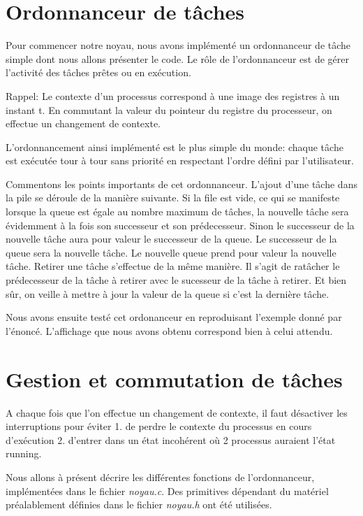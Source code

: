 \section{Ordonnanceur de tâches}
Pour commencer notre noyau, nous avons implémenté un ordonnanceur de tâche simple dont nous allons présenter le code. Le rôle de l'ordonnanceur est de gérer l'activité des tâches prêtes ou en exécution.

Rappel: Le contexte d'un processus correspond à une image des registres à un instant t. En commutant la valeur du pointeur du registre du processeur, on effectue un changement de contexte.


L'ordonnancement ainsi implémenté est le plus simple du monde: chaque tâche est exécutée tour à tour sans priorité en respectant l'ordre défini par l'utilisateur.

Commentons les points importants de cet ordonnanceur. L'ajout d'une tâche dans la pile se déroule de la manière suivante. Si la file est vide, ce qui se manifeste lorsque la queue est égale au nombre maximum de tâches, la nouvelle tâche sera évidemment à la fois son successeur et son prédecesseur. Sinon le successeur de la nouvelle tâche aura pour valeur le successeur de la queue. Le successeur de la queue sera la nouvelle tâche. Le nouvelle queue prend pour valeur la nouvelle tâche. Retirer une tâche s'effectue de la même manière. Il s'agit de ratâcher le prédecesseur de la tâche à retirer avec le sucesseur de la tâche à retirer. Et bien sûr, on veille à mettre à jour la valeur de la queue si c'est la dernière tâche.

Nous avons ensuite testé cet ordonanceur en reproduisant l'exemple donné par l'énoncé. L'affichage que nous avons obtenu correspond bien à celui attendu.


\section{Gestion et commutation de tâches}
A chaque fois que l'on effectue un changement de contexte, il faut désactiver les interruptions pour éviter 1. de perdre le contexte du processus en cours d'exécution 2. d'entrer dans un état incohérent où 2 processus auraient l'état running.

Nous allons à présent décrire les différentes fonctions de l'ordonnanceur, implémentées dans le fichier \textit{noyau.c}. Des primitives dépendant du matériel préalablement définies dans le fichier \textit{noyau.h} ont été utilisées.

